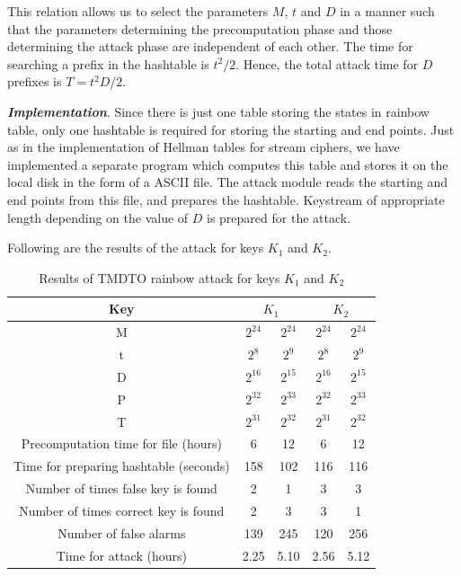 This relation allows us to select the parameters $M$, $t$ and $D$ in a manner such that the parameters determining the precomputation phase and those determining the attack phase are independent of each other. The time for searching a prefix in the hashtable is $t^2/2$. Hence, the total attack time for $D$ prefixes is $T = t^2D/2$. 

\noindent \textbf{\textit{Implementation}}. Since there is just one table storing the states in rainbow table, only one hashtable is required for storing the starting and end points. Just as in the implementation of Hellman tables for stream ciphers, we have implemented a separate program which computes this table and stores it on the local disk in the form of a ASCII file. The attack module reads the starting and end points from this file, and prepares the hashtable. Keystream of appropriate length depending on the value of $D$ is prepared for the attack. 

Following are the results of the attack for keys $K_1$ and $K_2$. 

\begin{table}[ht!]
\begin{center}
\begin{tabular}{|c||c|c||c|c|}
\hline
Key & \multicolumn{2}{c||}{\textbf{$K_1$}} & \multicolumn{2}{c|}{\textbf{$K_2$}} \\ \hline \hline
M																				&	$2^{24}$ 	&	$2^{24}$ 	&	$2^{24}$ 	&	$2^{24}$ 	\\ 
t	  																		&	$2^{8}$ 	&	$2^{9}$ 	&	$2^{8}$ 	&	$2^{9}$		\\ 
D	  																		&	$2^{16}$ 	&	$2^{15}$ 	&	$2^{16}$ 	&	$2^{15}$	\\ \hline \hline
P	  																		&	$2^{32}$ 	&	$2^{33}$ 	&	$2^{32}$ 	&	$2^{33}$	\\ \hline
T	  																		&	$2^{31}$ 	&	$2^{32}$ 	&	$2^{31}$ 	&	$2^{32}$	\\ \hline
Precomputation time for file (hours)		&	6 	 			&	12 				&	6					&	12 				\\ \hline
Time for preparing hashtable (seconds)	&	158				&	102				& 116				&	116				\\ \hline
Number of times false key is found			&	2 				&	1 				&	3 				&	3 				\\ \hline
Number of times correct key is found 		&	2 				&	3					&	3 				&	1 				\\ \hline
Number of false alarms									&	139				&	245				&	120				&	256				\\ \hline
Time for attack	(hours)									&	2.25 			&	5.10			&	2.56 		 	&	5.12 			\\ \hline
\end{tabular}
\end{center}
\caption{Results of TMDTO rainbow attack for keys $K_1$ and $K_2$}
\label{tab:rainbow-attack-results}
\end{table}

